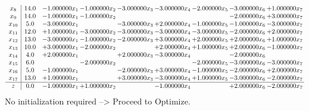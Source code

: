 \documentclass[10pt]{article}
\begin{document}
\[\begin{array}{c| c c@{\hskip 2pt} c@{\hskip 2pt} c@{\hskip 2pt} c@{\hskip 2pt} c@{\hskip 2pt} c@{\hskip 2pt} c@{\hskip 2pt} }
 x_{8}   &  14.0 & -1.000000 x_{1} & -1.000000 x_{2} & -3.000000 x_{3} & -3.000000 x_{4} & -2.000000 x_{5} & -3.000000 x_{6} & + 1.000000 x_{7}\\
 x_{9}   &  14.0 & -1.000000 x_{1} & -1.000000 x_{2} &    &    &   & -2.000000 x_{6} & + 3.000000 x_{7}\\
 x_{10}   &  5.0 & -3.000000 x_{1} &   & -3.000000 x_{3} & + 2.000000 x_{4} & -1.000000 x_{5} & -1.000000 x_{6} & -3.000000 x_{7}\\
 x_{11}   &  12.0 & + 1.000000 x_{1} & -3.000000 x_{2} & -3.000000 x_{3} & -3.000000 x_{4} & -3.000000 x_{5} & -2.000000 x_{6} & + 2.000000 x_{7}\\
 x_{12}   &  13.0 & -3.000000 x_{1} & -1.000000 x_{2} & -2.000000 x_{3} & + 3.000000 x_{4} & + 2.000000 x_{5} & + 2.000000 x_{6} & + 1.000000 x_{7}\\
 x_{13}   &  10.0 & + 3.000000 x_{1} & -2.000000 x_{2} &   & + 2.000000 x_{4} & + 1.000000 x_{5} & + 2.000000 x_{6} & -1.000000 x_{7}\\
 x_{14}   &  4.0 & + 2.000000 x_{1} &   & + 2.000000 x_{3} & -3.000000 x_{4} &   & -2.000000 x_{6} &   \\
 x_{15}   &  6.0  &   & -2.000000 x_{2} &    &   & -2.000000 x_{5} & -3.000000 x_{6} & -3.000000 x_{7}\\
 x_{16}   &  5.0 & -1.000000 x_{1} &   & -2.000000 x_{3} & + 3.000000 x_{4} & -1.000000 x_{5} & -2.000000 x_{6} & + 2.000000 x_{7}\\
 x_{17}   &  13.0 & + 1.000000 x_{1} &   & + 3.000000 x_{3} & -3.000000 x_{4} & + 1.000000 x_{5} & -3.000000 x_{6} & -2.000000 x_{7}\\
\hline
z    &  0.0 & -1.000000 x_{1} & + 1.000000 x_{2} &   & -1.000000 x_{4} &   & + 2.000000 x_{6} & -2.000000 x_{7}\\
\end{array}\]
No initialization required --> Proceed to Optimize. 
\end{document}
